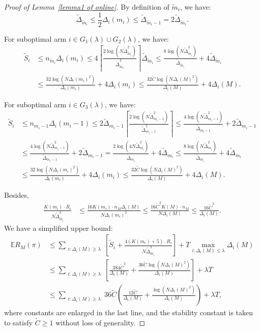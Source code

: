 \documentclass[11pt]{article}
\begin{document}
\begin{proof}[Proof of Lemma~\ref{lemma1 of online}]

By definition of $\tilde{m}_i$, we have:
\[  \tilde{\Delta}_{\tilde{m}_i} \leq \frac{1}{2}\Delta_i(m_i)\leq \tilde{\Delta}_{\tilde{m}_i-1}=2 \tilde{\Delta}_{\tilde{m}_i}.\]

For suboptimal arm $i\in G_1(\lambda)\cup G_2(\lambda)$, we have:
\begin{align*}
   \tilde{S}_i &\leq n_{\tilde{m}_i}\Delta_i(m_i)\leq 
4 \left\lceil \frac{2\log(N \tilde{\Delta}_{\tilde{m}_i}^2)}{\tilde{\Delta}_{\tilde{m}_i}^2} \right\rceil \tilde{\Delta}_{\tilde{m}_i} \leq \frac{8\log(N \tilde{\Delta}_{\tilde{m}_i}^2)}{\tilde{\Delta}_{\tilde{m}_i}} +4\tilde{\Delta}_{\tilde{m}_i} \\
& \le \frac{32\log(N \Delta_i(m_i)^2)}{\Delta_i(m_i)} +4\Delta_i(m_i)
\le  \frac{32 \tilde{C}\log(N \Delta_i(M)^2)}{\Delta_i(M)} +4\Delta_i(M).
\end{align*}

For suboptimal arm $i\in G_3(\lambda)$, we have:
\begin{align*}
     \tilde{S}_i &\leq n_{m_i-1}\Delta_i(m_i-1)\leq 2\tilde{\Delta}_{m_i-1} \left\lceil \frac{2\log(N \tilde{\Delta}_{m_i-1}^2)}{\tilde{\Delta}_{m_i-1}^2} \right\rceil  \leq \frac{4\log(N \tilde{\Delta}_{m_i-1}^2)}{\tilde{\Delta}_{m_i-1}}+2\tilde{\Delta}_{m_i-1} \\
     &\le \frac{4\log(N \tilde{\Delta}_{m_i-1}^2)}{\tilde{\Delta}_{m_i-1}}+2\tilde{\Delta}_{m_i-1}
     = \frac{2\log(4N \tilde{\Delta}_{m_i}^2)}{\tilde{\Delta}_{m_i}}+4\tilde{\Delta}_{m_i} 
     \le \frac{8\log(N \tilde{\Delta}_{m_i}^2)}{\tilde{\Delta}_{m_i}}+4\tilde{\Delta}_{m_i}\\ 
     &\le \frac{32\log(N \Delta_i(m_i)^2)}{\Delta_i(m_i)} +4\Delta_i(m_i)
\le  \frac{32 \tilde{C}\log(N \Delta_i(M)^2)}{\Delta_i(M)} +4\Delta_i(M).
\end{align*}

 Besides, 
\begin{align*}
    \frac{K(m_i)\cdot R_i}{N \tilde{\Delta}_{\tilde{m}_i}^2}&\leq  \frac{16K(m_i)\cdot n_M\Delta_i(M)}{N \Delta_i(m_i)^2}\leq \frac{16\tilde{C}^2K(M)\cdot n_M}{N\Delta_i(M)} \leq \frac{16\tilde{C}^2}{\Delta_i(M)}.
\end{align*}
We have a simplified upper bound:
\begin{align*}
\mathbb{E}R_M(\pi)&\leq \sum_{\substack{i: \Delta_i(M) \geq \lambda}} \left[ \tilde{S}_i+\frac{4\left(K(m_i)+5\right)\cdot R_i}{N\tilde{\Delta}_{\tilde{m}_i}^2}\right] +T\max_{i:\Delta_i(M)\leq \lambda}  \Delta_i(M)\\
&\leq
\sum_{\substack{i: \Delta_i(M) \geq \lambda}}
\left[
\frac{384\tilde{C}^2}{\Delta_i(M)}
+\frac{36\tilde{C}\log(N \Delta_i(M)^2)}{\Delta_i(M)}
\right]
+\lambda T\\
&\leq
\sum_{\substack{i: \Delta_i(M) \geq \lambda}}
36\tilde{C}
\left(
\frac{12\tilde{C}}{\Delta_i(M)}
+\frac{\log(N \Delta_i(M)^2)}{\Delta_i(M)}
\right)
+\lambda T,
\end{align*}
where constants are enlarged in the last line, and the stability constant is
taken to satisfy \(\tilde C\ge 1\) without loss of generality.
\end{proof}
\end{document}
